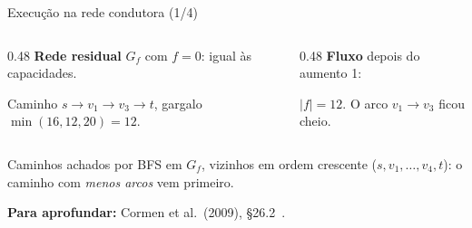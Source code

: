 \documentclass[aspectratio=169,xcolor=table]{beamer}
\newcommand{\nosrede}[1]{%
  \node[vert] (s)  at (0,0)     {$s$};
  \node[vert] (v1) at (1.7,1)   {$v_1$};
  \node[vert] (v2) at (1.7,-1)  {$v_2$};
  \node[vert] (v3) at (3.6,1)   {$v_3$};
  \node[vert] (v4) at (3.6,-1)  {$v_4$};
  \node[vert] (t)  at (5.3,0)   {$t$};
  \def\lista{#1}\ifx\lista\empty\else
    \foreach \v/\n in {#1} \node[vS] at (\v) {$\n$};\fi
}
\newcommand{\rede}[2]{%
  \nosrede{#2}
  \edef\arcosR{#1}
  \foreach \u/\v/\l/\e in \arcosR \draw[\e] (\u) to (\v);
  \foreach \u/\v/\l/\e in \arcosR \path (\u) to node[peso] {\l} (\v);
}
\newcommand{\redeR}[2]{%
  \nosrede{#2}
  \edef\arcosR{#1}
  \foreach \u/\v/\l/\e in \arcosR \draw[\e] (\u) to (\v);
  \foreach \u/\v/\l/\e in \arcosR \path[\e, draw=none] (\u) to node[peso] {\l} (\v);
}
\newcommand{\fonte}[1]{%
  \vfill
  {\tiny\color{gray!55!black}\textbf{Para aprofundar:} #1\par}%
}
\begin{document}
\begin{frame}{Execução na rede condutora (1/4)}
  \begin{columns}[T]
    \begin{column}{0.48\textwidth}
      \scriptsize
      \textbf{Rede residual} $G_f$ com $f = 0$: igual às capacidades.
      \begin{center}
      \end{center}
      Caminho $s \to v_1 \to v_3 \to t$, gargalo $\min(16, 12, 20) = 12$.
    \end{column}
    \begin{column}{0.48\textwidth}
      \scriptsize
      \textbf{Fluxo} depois do aumento 1:
      \begin{center}
      \end{center}
      $|f| = 12$. O arco $v_1 \to v_3$ ficou cheio.
    \end{column}
  \end{columns}
  \medskip
  {\scriptsize Caminhos achados por BFS em $G_f$, vizinhos em ordem crescente
  ($s, v_1, \dots, v_4, t$): o caminho com \emph{menos arcos} vem primeiro.\par}
  \fonte{Cormen et al.\ (2009), \S 26.2~\cite{cormen2009introduction}.}
\end{frame}
\end{document}

